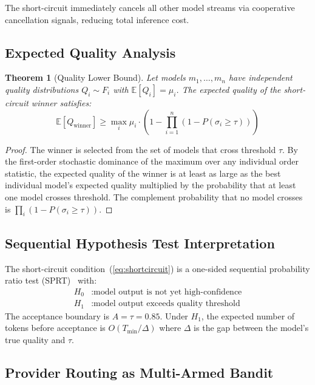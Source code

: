 \documentclass[11pt,twocolumn]{article}
\newtheorem{theorem}{Theorem}
\begin{document}
The short-circuit immediately cancels all other model streams via cooperative
cancellation signals, reducing total inference cost.

\subsection{Expected Quality Analysis}

\begin{theorem}[Quality Lower Bound]
\label{thm:quality}
Let models $m_1, \ldots, m_n$ have independent quality distributions $Q_i \sim F_i$
with $\mathbb{E}[Q_i] = \mu_i$. The expected quality of the short-circuit winner
satisfies:
\begin{equation}
  \mathbb{E}[Q_{\text{winner}}] \geq \max_i \mu_i \cdot \left(1 - \prod_{i=1}^n (1 - P(\sigma_i \geq \tau))\right)
\end{equation}
\end{theorem}

\begin{proof}
The winner is selected from the set of models that cross threshold $\tau$. By the
first-order stochastic dominance of the maximum over any individual order statistic,
the expected quality of the winner is at least as large as the best individual model's
expected quality multiplied by the probability that at least one model crosses
threshold. The complement probability that no model crosses is
$\prod_i (1 - P(\sigma_i \geq \tau))$.
\end{proof}

\subsection{Sequential Hypothesis Test Interpretation}

The short-circuit condition~(\ref{eq:shortcircuit}) is a one-sided sequential
probability ratio test (SPRT)~\cite{wald1945sequential} with:
\begin{align}
  H_0 &: \text{model output is not yet high-confidence} \\
  H_1 &: \text{model output exceeds quality threshold}
\end{align}
The acceptance boundary is $A = \tau = 0.85$. Under $H_1$, the expected number of
tokens before acceptance is $O(T_{\min} / \Delta)$ where $\Delta$ is the gap between
the model's true quality and $\tau$.

\subsection{Provider Routing as Multi-Armed Bandit}
\end{document}
